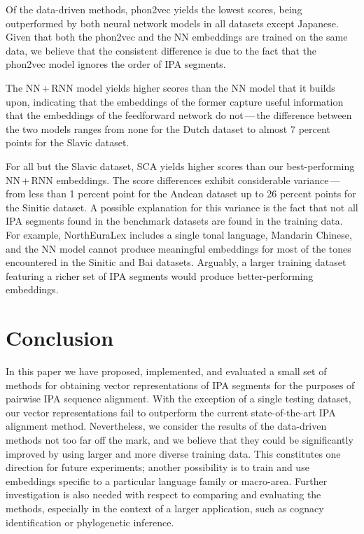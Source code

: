 \documentclass[a4paper]{report}
\begin{document}
Of the data-driven methods, phon2vec yields the lowest scores, being outperformed by both neural network models in all datasets except Japanese.
Given that both the phon2vec and the NN embeddings are trained on the same data,
we believe that the consistent difference is due to the fact that the phon2vec model ignores the order of IPA segments.

The NN\,+\,RNN model yields higher scores than the NN model that it builds upon,
indicating that the embeddings of the former capture useful information that the embeddings of the feedforward network do not\,---\,the
difference between the two models ranges from none for the Dutch dataset to almost 7 percent points for the Slavic dataset.

For all but the Slavic dataset, SCA yields higher scores than our best-performing NN\,+\,RNN embeddings.
The score differences exhibit considerable variance\,---\,from less than 1 percent point for the Andean dataset up to 26 percent points for the Sinitic dataset.
A possible explanation for this variance is the fact that not all IPA segments found in the benchmark datasets are found in the training data.
For example, NorthEuraLex includes a single tonal language, Mandarin Chinese,
and the NN model cannot produce meaningful embeddings for most of the tones encountered in the Sinitic and Bai datasets.
Arguably, a larger training dataset featuring a richer set of IPA segments would produce better-performing embeddings.


\chapter{Conclusion}

In this paper we have proposed, implemented, and evaluated a small set of methods for obtaining vector representations of IPA segments
for the purposes of pairwise IPA sequence alignment.
With the exception of a single testing dataset, our vector representations fail to outperform the current state-of-the-art IPA alignment method.
Nevertheless, we consider the results of the data-driven methods not too far off the mark,
and we believe that they could be significantly improved by using larger and more diverse training data.
This constitutes one direction for future experiments;
another possibility is to train and use embeddings specific to a particular language family or macro-area.
Further investigation is also needed with respect to comparing and evaluating the methods,
especially in the context of a larger application, such as cognacy identification or phylogenetic inference.



\end{document}
